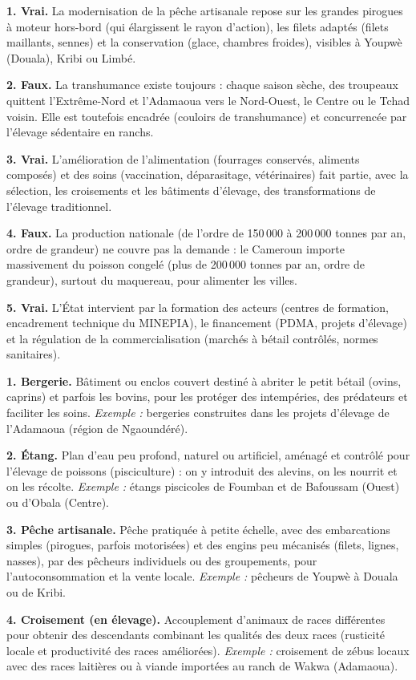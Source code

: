 \documentclass[11pt]{article}
\begin{document}
\begin{corrige}
\textbf{1. Vrai.} La modernisation de la pêche artisanale repose sur les grandes pirogues à moteur hors-bord (qui élargissent le rayon d'action), les filets adaptés (filets maillants, sennes) et la conservation (glace, chambres froides), visibles à Youpwè (Douala), Kribi ou Limbé.

\textbf{2. Faux.} La transhumance existe toujours : chaque saison sèche, des troupeaux quittent l'Extrême-Nord et l'Adamaoua vers le Nord-Ouest, le Centre ou le Tchad voisin. Elle est toutefois encadrée (couloirs de transhumance) et concurrencée par l'élevage sédentaire en ranchs.

\textbf{3. Vrai.} L'amélioration de l'alimentation (fourrages conservés, aliments composés) et des soins (vaccination, déparasitage, vétérinaires) fait partie, avec la sélection, les croisements et les bâtiments d'élevage, des transformations de l'élevage traditionnel.

\textbf{4. Faux.} La production nationale (de l'ordre de 150\,000 à 200\,000 tonnes par an, ordre de grandeur) ne couvre pas la demande : le Cameroun importe massivement du poisson congelé (plus de 200\,000 tonnes par an, ordre de grandeur), surtout du maquereau, pour alimenter les villes.

\textbf{5. Vrai.} L'État intervient par la formation des acteurs (centres de formation, encadrement technique du MINEPIA), le financement (PDMA, projets d'élevage) et la régulation de la commercialisation (marchés à bétail contrôlés, normes sanitaires).
\end{corrige}

\begin{corrige}
\textbf{1. Bergerie.} Bâtiment ou enclos couvert destiné à abriter le petit bétail (ovins, caprins) et parfois les bovins, pour les protéger des intempéries, des prédateurs et faciliter les soins. \emph{Exemple :} bergeries construites dans les projets d'élevage de l'Adamaoua (région de Ngaoundéré).

\textbf{2. Étang.} Plan d'eau peu profond, naturel ou artificiel, aménagé et contrôlé pour l'élevage de poissons (pisciculture) : on y introduit des alevins, on les nourrit et on les récolte. \emph{Exemple :} étangs piscicoles de Foumban et de Bafoussam (Ouest) ou d'Obala (Centre).

\textbf{3. Pêche artisanale.} Pêche pratiquée à petite échelle, avec des embarcations simples (pirogues, parfois motorisées) et des engins peu mécanisés (filets, lignes, nasses), par des pêcheurs individuels ou des groupements, pour l'autoconsommation et la vente locale. \emph{Exemple :} pêcheurs de Youpwè à Douala ou de Kribi.

\textbf{4. Croisement (en élevage).} Accouplement d'animaux de races différentes pour obtenir des descendants combinant les qualités des deux races (rusticité locale et productivité des races améliorées). \emph{Exemple :} croisement de zébus locaux avec des races laitières ou à viande importées au ranch de Wakwa (Adamaoua).
\end{corrige}
\end{document}
